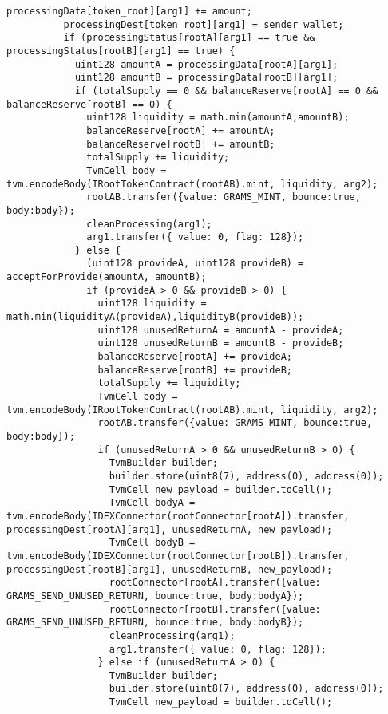 \begin{lstlisting}[firstnumber=248]
          processingData[token_root][arg1] += amount;
          processingDest[token_root][arg1] = sender_wallet;
          if (processingStatus[rootA][arg1] == true && processingStatus[rootB][arg1] == true) {
            uint128 amountA = processingData[rootA][arg1];
            uint128 amountB = processingData[rootB][arg1];
            if (totalSupply == 0 && balanceReserve[rootA] == 0 && balanceReserve[rootB] == 0) {
              uint128 liquidity = math.min(amountA,amountB);
              balanceReserve[rootA] += amountA;
              balanceReserve[rootB] += amountB;
              totalSupply += liquidity;
              TvmCell body = tvm.encodeBody(IRootTokenContract(rootAB).mint, liquidity, arg2);
              rootAB.transfer({value: GRAMS_MINT, bounce:true, body:body});
              cleanProcessing(arg1);
              arg1.transfer({ value: 0, flag: 128});
            } else {
              (uint128 provideA, uint128 provideB) = acceptForProvide(amountA, amountB);
              if (provideA > 0 && provideB > 0) {
                uint128 liquidity = math.min(liquidityA(provideA),liquidityB(provideB));
                uint128 unusedReturnA = amountA - provideA;
                uint128 unusedReturnB = amountB - provideB;
                balanceReserve[rootA] += provideA;
                balanceReserve[rootB] += provideB;
                totalSupply += liquidity;
                TvmCell body = tvm.encodeBody(IRootTokenContract(rootAB).mint, liquidity, arg2);
                rootAB.transfer({value: GRAMS_MINT, bounce:true, body:body});
                if (unusedReturnA > 0 && unusedReturnB > 0) {
                  TvmBuilder builder;
                  builder.store(uint8(7), address(0), address(0));
                  TvmCell new_payload = builder.toCell();
                  TvmCell bodyA = tvm.encodeBody(IDEXConnector(rootConnector[rootA]).transfer, processingDest[rootA][arg1], unusedReturnA, new_payload);
                  TvmCell bodyB = tvm.encodeBody(IDEXConnector(rootConnector[rootB]).transfer, processingDest[rootB][arg1], unusedReturnB, new_payload);
                  rootConnector[rootA].transfer({value: GRAMS_SEND_UNUSED_RETURN, bounce:true, body:bodyA});
                  rootConnector[rootB].transfer({value: GRAMS_SEND_UNUSED_RETURN, bounce:true, body:bodyB});
                  cleanProcessing(arg1);
                  arg1.transfer({ value: 0, flag: 128});
                } else if (unusedReturnA > 0) {
                  TvmBuilder builder;
                  builder.store(uint8(7), address(0), address(0));
                  TvmCell new_payload = builder.toCell();

\end{lstlisting}
